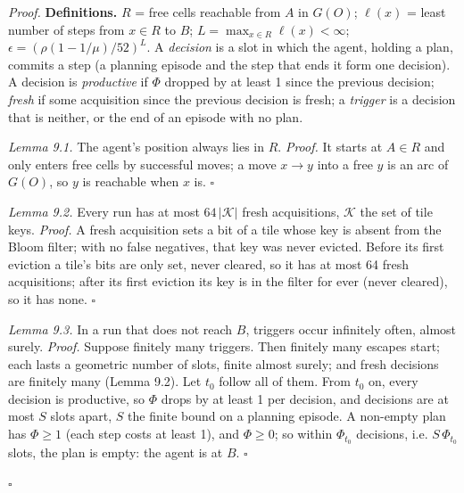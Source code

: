 \documentclass[11pt,a4paper]{article}
\newenvironment{proof}{\par\noindent\textit{Proof.}\enspace\ignorespaces}
  {\leavevmode\unskip\penalty9999\hbox{}\nobreak\hfill\quad\hbox{$\square$}\par\medskip}
\begin{document}
\begin{proof}
\textbf{Definitions.} $R$ = free cells reachable from $A$ in $G(O)$; $\ell(x)$ = least number of steps from $x\in R$ to $B$;
$L=\max_{x\in R}\ell(x)<\infty$; $\epsilon=(\rho(1-1/\mu)/52)^L$. A \emph{decision} is a slot in which the agent, holding a
plan, commits a step (a planning episode and the step that ends it form one decision). A decision is \emph{productive} if
$\Phi$ dropped by at least 1 since the previous decision; \emph{fresh} if some acquisition since the previous decision is
fresh; a \emph{trigger} is a decision that is neither, or the end of an episode with no plan.



\emph{Lemma 9.1.} The agent's position always lies in $R$. \emph{Proof.} It starts at $A\in R$ and only enters free cells by
successful moves; a move $x\to y$ into a free $y$ is an arc of $G(O)$, so $y$ is reachable when $x$ is. \hfill$\square$\par\smallskip



\emph{Lemma 9.2.} Every run has at most $64\,|\mathcal K|$ fresh acquisitions, $\mathcal K$ the set of tile keys.
\emph{Proof.} A fresh acquisition sets a bit of a tile whose key is absent from the Bloom filter; with no false negatives,
that key was never evicted. Before its first eviction a tile's bits are only set, never cleared, so it has at most 64
fresh acquisitions; after its first eviction its key is in the filter for ever (never cleared), so it has none. \hfill$\square$\par\smallskip



\emph{Lemma 9.3.} In a run that does not reach $B$, triggers occur infinitely often, almost surely.
\emph{Proof.} Suppose finitely many triggers. Then finitely many escapes start; each lasts a geometric number of slots,
finite almost surely; and fresh decisions are finitely many (Lemma 9.2). Let $t_0$ follow all of them. From $t_0$ on,
every decision is productive, so $\Phi$ drops by at least 1 per decision, and decisions are at most $S$ slots apart, $S$
the finite bound on a planning episode. A non-empty plan has $\Phi\ge1$ (each step costs at least 1), and $\Phi\ge0$;
so within $\Phi_{t_0}$ decisions, i.e. $S\,\Phi_{t_0}$ slots, the plan is empty: the agent is at $B$. \hfill$\square$\par\smallskip




\end{proof}
\end{document}
